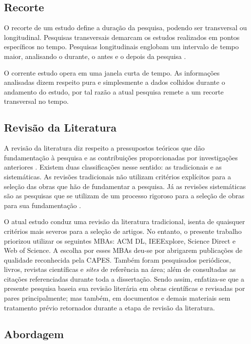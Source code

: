 \subsection{Recorte}\label{sub:Recorte}

O recorte de um estudo define a duração da pesquisa, podendo ser transversal ou longitudinal. Pesquisas transversais demarcam os estudos realizados em pontos específicos no tempo. Pesquisas longitudinais englobam um intervalo de tempo maior, analisando o durante, o antes e o depois da pesquisa \cite{hochman2005desenhos}. 

O corrente estudo opera em uma janela curta de tempo. As informações analisadas dizem respeito pura e simplesmente a dados colhidos durante o andamento do estudo, por tal razão a atual pesquisa remete a um recorte transversal no tempo. 

\subsection{Revisão da Literatura}\label{sub:Literatura}

A revisão da literatura diz respeito a pressupostos teóricos que dão fundamentação à pesquisa e as contribuições proporcionadas por investigações anteriores \cite{carlos2002elaborar}. Existem duas classificações nesse sentido: as tradicionais e as sistemáticas. As revisões tradicionais não utilizam critérios explícitos para a seleção das obras que hão de fundamentar a pesquisa. Já as revisões sistemáticas são as pesquisas que se utilizam de um processo rigoroso para a seleção de obras para sua fundamentação \cite{ferenhof2016desmistificando}.

O atual estudo conduz uma revisão da literatura tradicional, isenta de quaisquer critérios mais severos para a seleção de artigos. No entanto, o presente trabalho priorizou utilizar os seguintes \ac{MBAs}: ACM DL, IEEExplore, Science Direct e Web of Science. A escolha por esses \ac{MBAs} deu-se por abrigarem publicações de qualidade reconhecida pela \ac{CAPES}. Também foram pesquisados periódicos, livros, revistas científicas e \textit{sites} de referência na área; além de consultadas as citações referenciadas durante toda a dissertação. Sendo assim, enfatiza-se que a presente pesquisa baseia sua revisão literária em obras científicas e revisadas por pares principalmente; mas também, em documentos e demais materiais sem tratamento prévio retornados durante a etapa de revisão da literatura. 

\subsection{Abordagem}\label{sub:Abordagem}

